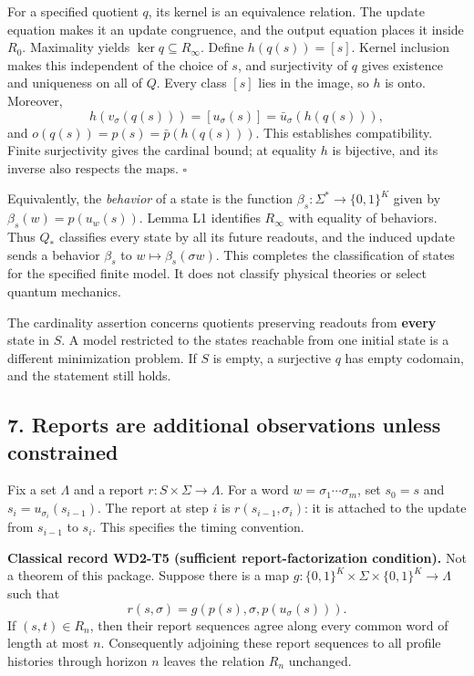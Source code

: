 \documentclass[
  11pt,
]{article}
\begin{document}
For a specified quotient \(q\), its kernel is an equivalence relation.
The update equation makes it an update congruence, and the output
equation places it inside \(R_0\). Maximality yields
\(\ker q\subseteq R_\infty\). Define \(h(q(s))=[s]\). Kernel inclusion
makes this independent of the choice of \(s\), and surjectivity of \(q\)
gives existence and uniqueness on all of \(Q\). Every class \([s]\) lies
in the image, so \(h\) is onto. Moreover, \[
 h(v_\sigma(q(s)))=[u_\sigma(s)]
      =\bar u_\sigma(h(q(s))),
\] and \(o(q(s))=p(s)=\bar p(h(q(s)))\). This establishes compatibility.
Finite surjectivity gives the cardinal bound; at equality \(h\) is
bijective, and its inverse also respects the maps. \(\square\)

Equivalently, the \emph{behavior} of a state is the function
\(\beta_s:\Sigma^*\to\{0,1\}^K\) given by \(\beta_s(w)=p(u_w(s))\).
Lemma L1 identifies \(R_\infty\) with equality of behaviors. Thus
\(Q_*\) classifies every state by all its future readouts, and the
induced update sends a behavior \(\beta_s\) to
\(w\mapsto\beta_s(\sigma w)\). This completes the classification of
states for the specified finite model. It does not classify physical
theories or select quantum mechanics.

The cardinality assertion concerns quotients preserving readouts from
\textbf{every} state in \(S\). A model restricted to the states
reachable from one initial state is a different minimization problem. If
\(S\) is empty, a surjective \(q\) has empty codomain, and the statement
still holds.

\subsection{7. Reports are additional observations unless
constrained}\label{reports-are-additional-observations-unless-constrained}

Fix a set \(\Lambda\) and a report \(r:S\times\Sigma\to\Lambda\). For a
word \(w=\sigma_1\cdots\sigma_m\), set \(s_0=s\) and
\(s_i=u_{\sigma_i}(s_{i-1})\). The report at step \(i\) is
\(r(s_{i-1},\sigma_i)\): it is attached to the update from \(s_{i-1}\)
to \(s_i\). This specifies the timing convention.

\textbf{Classical record WD2-T5 (sufficient report-factorization condition).}
Not a theorem of this package. Suppose there is a map
\(g:\{0,1\}^K\times\Sigma\times\{0,1\}^K\to\Lambda\) such that \[
 r(s,\sigma)=g(p(s),\sigma,p(u_\sigma(s))).
\] If \((s,t)\in R_n\), then their report sequences agree along every
common word of length at most \(n\). Consequently adjoining these report
sequences to all profile histories through horizon \(n\) leaves the
relation \(R_n\) unchanged.
\end{document}

